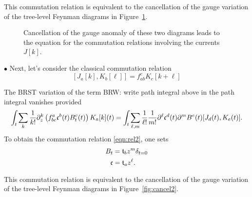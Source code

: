 \documentclass[11pt]{amsart}
\def\brian#1{{\textcolor{blue!65!red}{BRW: {#1}}}}
\begin{document}
This commutation relation is equivalent to the cancellation of the gauge variation of the tree-level Feynman diagrams in Figure~\ref{fig:cancel1}.

\begin{figure}
	\caption{Cancellation of the gauge anomaly of these two diagrams leads to the equation for the commutation relations involving the currents $J[k]$.
	\label{fig:cancel1}}
\end{figure}

$\bullet$
Next, let's consider the classical commutation relation 
\begin{equation}\label{eqn:rel2}
[J_a [k] , K_b [\ell]] = f_{ab}^c K_{c} [k+\ell]
\end{equation}

The BRST variation of the term \brian{write path integral above} in the path integral vanishes provided
\[
\int_t \sum_k \frac1{k!} \partial_z^k \left(f_{bc}^a \mathfrak c^b(t) B^c_t (t) \right) K_a[k] (t) = \int_t \sum_{\ell,m} \frac1{\ell!} \frac1{m!} \partial^\ell \mathfrak c^d (t) \partial^m B^e (t) [J_d (t), K_e(t)]  .
\] 
To obtain the commutation relation \eqref{eqn:rel2}, one sets 
\begin{align*}
B_t & = \mathfrak t_b z^{m} \delta_{t=0} \\
\mathfrak c & = \mathfrak t_a z^\ell .
\end{align*}

This commutation relation is equivalent to the cancellation of the gauge variation of the tree-level Feynman diagrams in Figure~\ref{fig:cancel2}.
\end{document}
